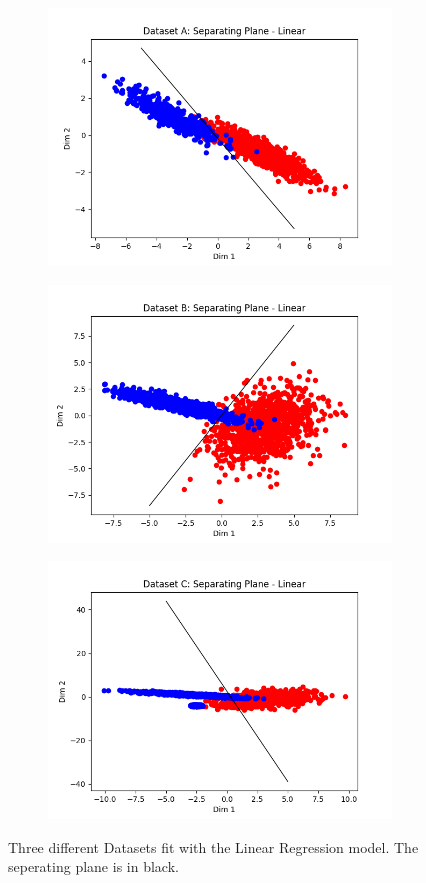 \documentclass[paper=a4, fontsize=11pt]{scrartcl} %
\numberwithin{equation}{section} %
\numberwithin{figure}{section} %
\numberwithin{table}{section} %
\begin{document}
\begin{figure}
	\begin{subfigure}{.5\textwidth}
		\centering
		\includegraphics[width=.9\linewidth]{img_A_Lin.png}
	\end{subfigure}
	\begin{subfigure}{.5\textwidth}
		\centering
		\includegraphics[width=.9\linewidth]{img_B_Lin.png}
	\end{subfigure}
	\begin{subfigure}{.5\textwidth}
		\centering
		\includegraphics[width=.9\linewidth]{img_C_Lin.png}
	\end{subfigure}
	\caption{Three different Datasets fit with the Linear Regression model. The seperating plane is in black.}
\end{figure}
\end{document}
